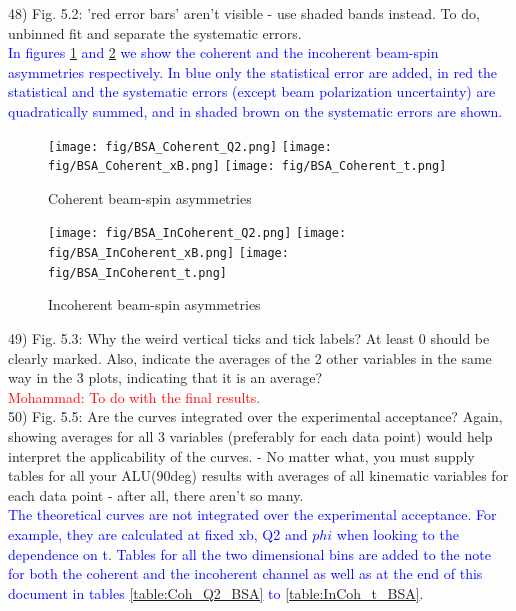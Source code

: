 48) Fig. 5.2: 'red error bars' aren't visible - use shaded bands instead.
    To do, unbinned fit and separate the systematic errors. \\
    \textcolor{blue}{In figures \ref{fig:coh_alu_sep} and 
       \ref{fig:incoh_alu_sep} we show the coherent and the incoherent 
       beam-spin asymmetries respectively. In blue only the statistical error 
       are added, in red the statistical and the systematic errors (except beam 
    polarization uncertainty) are quadratically summed, and in shaded brown on 
 the systematic errors are shown. } \\
 \begin{figure}[tbp]
 \centering
 \texttt{[image: fig/BSA\_Coherent\_Q2.png]}
 \texttt{[image: fig/BSA\_Coherent\_xB.png]}
 \texttt{[image: fig/BSA\_Coherent\_t.png]}
 \caption{Coherent beam-spin asymmetries}
 \label{fig:coh_alu_sep}
 \end{figure}

 \begin{figure}[tbp]
 \centering
 \texttt{[image: fig/BSA\_InCoherent\_Q2.png]}
 \texttt{[image: fig/BSA\_InCoherent\_xB.png]}
 \texttt{[image: fig/BSA\_InCoherent\_t.png]}
 \caption{Incoherent beam-spin asymmetries}
 \label{fig:incoh_alu_sep}
 \end{figure}



49) Fig. 5.3: Why the weird vertical ticks and tick labels? At least 0 should 
be clearly marked. Also, indicate the averages of the 2 other variables in the 
same way in the 3 plots, indicating that it is an average? \\
\textcolor{red}{Mohammad: To do with the final results.} \\

50) Fig. 5.5: Are the curves integrated over the experimental acceptance? 
Again, showing averages for all 3 variables (preferably for each data point) 
would help interpret the applicability of the curves.
- No matter what, you must supply tables for all your ALU(90deg) results with 
averages of all kinematic variables for each data point - after all, there 
aren't so many. \\
\textcolor{blue}{The theoretical curves are not integrated over the 
   experimental acceptance. For example, they are calculated at fixed xb, Q2 
   and $phi$ when looking to the dependence on t. Tables for all the two 
   dimensional bins are added to the note for both the coherent and the 
   incoherent channel as well as at the end of this document in tables 
   \ref{table:Coh_Q2_BSA} to \ref{table:InCoh_t_BSA}.  
} \\  

